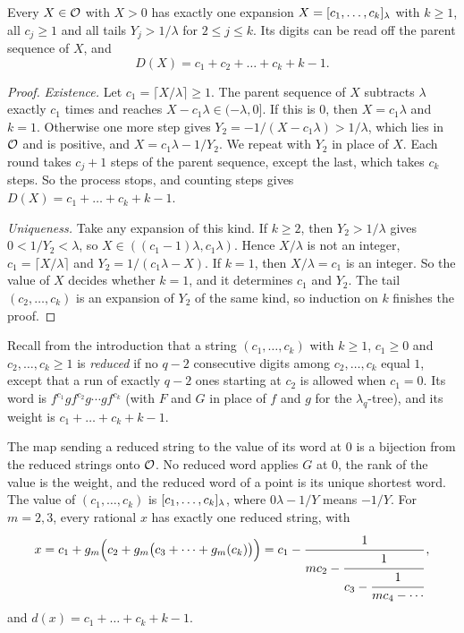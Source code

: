 \begin{lemma}\label{lem:expansion}
Every $X\in\mathcal{O}$ with $X>0$ has exactly one expansion $X=[c_1,\dots,c_k]_{\lambda}$ with $k\ge1$, all
$c_j\ge1$ and all tails $Y_j>1/\lambda$ for $2\le j\le k$. Its digits can be read off the parent
sequence of $X$, and
\[
D(X)=c_1+c_2+\dots+c_k+k-1 .
\]
\end{lemma}

\begin{proof}
\emph{Existence.} Let $c_1=\lceil X/\lambda\rceil\ge1$. The parent sequence of $X$ subtracts $\lambda$
exactly $c_1$ times and reaches $X-c_1\lambda\in(-\lambda,0]$. If this is $0$, then $X=c_1\lambda$ and
$k=1$. Otherwise one more step gives $Y_2=-1/(X-c_1\lambda)>1/\lambda$, which lies in $\mathcal{O}$ and is
positive, and $X=c_1\lambda-1/Y_2$. We repeat with $Y_2$ in place of $X$. Each round takes $c_j+1$
steps of the parent sequence, except the last, which takes $c_k$ steps. So the process stops, and
counting steps gives $D(X)=c_1+\dots+c_k+k-1$.

\emph{Uniqueness.} Take any expansion of this kind. If $k\ge2$, then $Y_2>1/\lambda$ gives
$0<1/Y_2<\lambda$, so $X\in((c_1-1)\lambda,c_1\lambda)$. Hence $X/\lambda$ is not an integer,
$c_1=\lceil X/\lambda\rceil$ and $Y_2=1/(c_1\lambda-X)$. If $k=1$, then $X/\lambda=c_1$ is an integer.
So the value of $X$ decides whether $k=1$, and it determines $c_1$ and $Y_2$. The tail
$(c_2,\dots,c_k)$ is an expansion of $Y_2$ of the same kind, so induction on $k$ finishes the proof.
\end{proof}

Recall from the introduction that a string $(c_1,\dots,c_k)$ with $k\ge1$, $c_1\ge0$ and
$c_2,\dots,c_k\ge1$ is \emph{reduced} if no $q-2$ consecutive digits among $c_2,\dots,c_k$ equal $1$,
except that a run of exactly $q-2$ ones starting at $c_2$ is allowed when $c_1=0$. Its word is
$f^{c_1}gf^{c_2}g\cdots gf^{c_k}$ (with $F$ and $G$ in place of $f$ and $g$ for the $\lambda_q$-tree),
and its weight is $c_1+\dots+c_k+k-1$.

\begin{theorem}[Theorem~B$_q$]\label{thm:Bq}
The map sending a reduced string to the value of its word at $0$ is a bijection from the reduced
strings onto $\mathcal{O}$. No reduced word applies $G$ at $0$, the rank of the value is the weight, and the
reduced word of a point is its unique shortest word. The value of $(c_1,\dots,c_k)$ is
$[c_1,\dots,c_k]_{\lambda}$, where $0\lambda-1/Y$ means $-1/Y$. For $m=2,3$, every rational $x$ has exactly
one reduced string, with
\[
x=c_1+g_m\Bigl(c_2+g_m\bigl(c_3+\dots+g_m(c_k)\bigr)\Bigr)
=c_1-\cfrac{1}{mc_2-\cfrac{1}{c_3-\cfrac{1}{mc_4-\cdots}}}\,,
\]
and $d(x)=c_1+\dots+c_k+k-1$.
\end{theorem}

